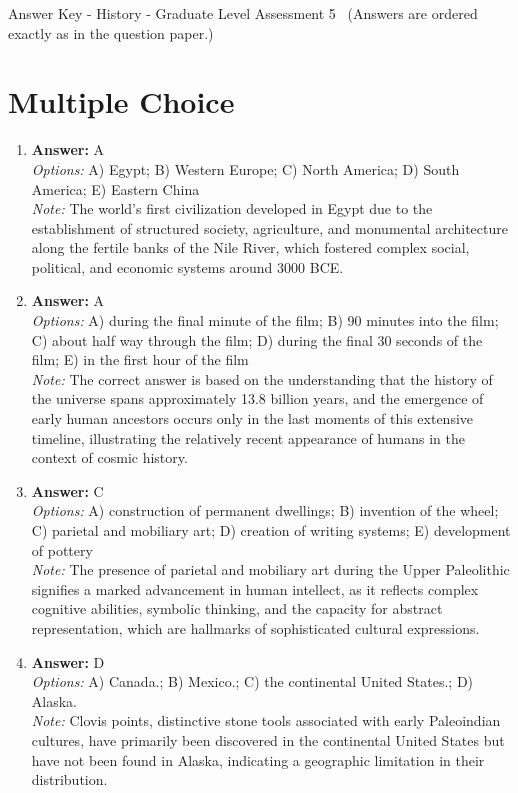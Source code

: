 \documentclass[12pt]{article}
\begin{document}
\begin{center}
Answer Key - History - Graduate Level Assessment 5 \
\small (Answers are ordered exactly as in the question paper.)
\end{center}

\section*{Multiple Choice}
\begin{enumerate}[label=\arabic*.]
\item \textbf{Answer:} A
\\ \textit{Options:} A) Egypt; B) Western Europe; C) North America; D) South America; E) Eastern China
\\ \textit{Note:} The world's first civilization developed in Egypt due to the establishment of structured society, agriculture, and monumental architecture along the fertile banks of the Nile River, which fostered complex social, political, and economic systems around 3000 BCE.
\item \textbf{Answer:} A
\\ \textit{Options:} A) during the final minute of the film; B) 90 minutes into the film; C) about half way through the film; D) during the final 30 seconds of the film; E) in the first hour of the film
\\ \textit{Note:} The correct answer is based on the understanding that the history of the universe spans approximately 13.8 billion years, and the emergence of early human ancestors occurs only in the last moments of this extensive timeline, illustrating the relatively recent appearance of humans in the context of cosmic history.
\item \textbf{Answer:} C
\\ \textit{Options:} A) construction of permanent dwellings; B) invention of the wheel; C) parietal and mobiliary art; D) creation of writing systems; E) development of pottery
\\ \textit{Note:} The presence of parietal and mobiliary art during the Upper Paleolithic signifies a marked advancement in human intellect, as it reflects complex cognitive abilities, symbolic thinking, and the capacity for abstract representation, which are hallmarks of sophisticated cultural expressions.
\item \textbf{Answer:} D
\\ \textit{Options:} A) Canada.; B) Mexico.; C) the continental United States.; D) Alaska.
\\ \textit{Note:} Clovis points, distinctive stone tools associated with early Paleoindian cultures, have primarily been discovered in the continental United States but have not been found in Alaska, indicating a geographic limitation in their distribution.

\end{enumerate}
\end{document}
